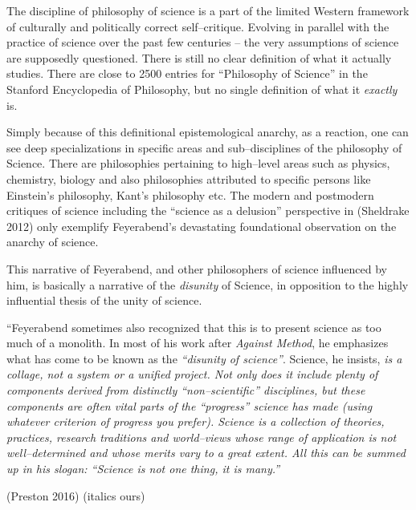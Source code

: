 The discipline of philosophy of science is a part of the limited Western framework of culturally and politically correct self–critique. Evolving in parallel with the practice of science over the past few centuries – the very assumptions of science are supposedly questioned. There is still no clear definition of what it actually studies. There are close to 2500 entries for “Philosophy of Science” in the Stanford Encyclopedia of Philosophy, but no single definition of what it \textit{exactly} is.

Simply because of this definitional epistemological anarchy, as a reaction, one can see deep specializations in specific areas and sub–disci\-plines of the philosophy of Science. There are philosophies pertaining to high–level areas such as physics, chemistry, biology and also philosophies attributed to specific persons like Einstein’s philosophy, Kant’s philosophy etc. The modern and postmodern critiques of science including the “science as a delusion” perspective in (Sheldrake 2012) only exemplify Feyerabend’s devastating foundational observation on the anarchy of science.

This narrative of Feyerabend, and other philosophers of science influenced by him, is basically a narrative of the \textit{disunity} of Science, in opposition to the highly influential thesis of the unity of science.

\begin{myquote}
“Feyerabend sometimes also recognized that this is to present science as too much of a monolith. In most of his work after \textit{Against Method}, he emphasizes what has come to be known as the \textit{“disunity of science”}. Science, he insists, \textit{is a collage, not a system or a unified project. Not only does it include plenty of components derived from distinctly “non–scientific” disciplines, but these components are often vital parts of the “progress” science has made (using whatever criterion of progress you prefer). Science is a collection of theories, practices, research traditions and world–views whose range of application is not well–determined and whose merits vary to a great extent. All this can be summed up in his slogan: “Science is not one thing, it is many.”}
\end{myquote}

\hfill (Preston 2016) (italics ours)

